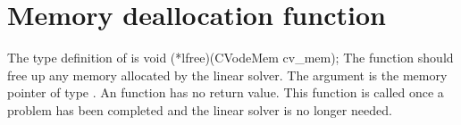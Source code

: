 
\section{Memory deallocation function}
The type definition of  is
{
  void (*lfree)(CVodeMem cv\_mem);
}
{
  The function  should free up any memory allocated by the linear
  solver.
}
{
  The argument  is the {\cvodes} memory pointer of type .
}
{
  An  function has no return value.
}
{
  This function is called once a problem has been completed and the 
  linear solver is no longer needed.
}